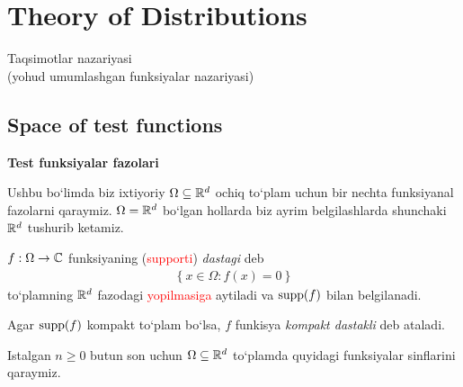 \section{Theory of Distributions}

\begin{center}
    \Large Taqsimotlar nazariyasi \\
    (yohud umumlashgan funksiyalar nazariyasi)
\end{center}

\subsection{Space of test functions}
\textbf{Test funksiyalar fazolari}

Ushbu bo`limda biz ixtiyoriy $\Omega\subseteq {\mathbb{R}^{d}}$ ochiq to`plam uchun bir nechta funksiyanal fazolarni qaraymiz. $\Omega={\mathbb{R}^{d}}$ bo`lgan hollarda biz ayrim belgilashlarda shunchaki ${\mathbb{R}^{d}}$ tushurib ketamiz. 

\begin{definition}
    $f:\Omega \rightarrow \mathbb{C} $ funksiyaning (\textcolor{red}{supporti}) \emph{dastagi} deb
    \begin{align}
        \left\{x\in \Omega: f(x)=0  \right\}
    \end{align}
    to`plamning ${\mathbb{R}^{d}}$ fazodagi \textcolor{red}{yopilmasiga} aytiladi va $\operatorname{supp}(f)$ bilan belgilanadi. 

    Agar $\operatorname{supp}(f)$ kompakt to`plam bo`lsa, $f$ funkisya \emph{kompakt dastakli} deb ataladi.
\end{definition}

Istalgan $n\ge 0$ butun son uchun $\Omega\subseteq{\mathbb{R}^{d}}$ to`plamda quyidagi funksiyalar sinflarini qaraymiz.

